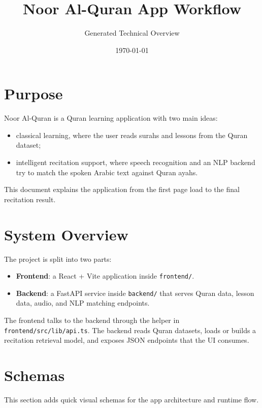 \documentclass[11pt,a4paper]{article}
\title{Noor Al-Quran App Workflow}\author{Generated Technical Overview}\date{\today}
\begin{document}
\maketitle

\section{Purpose}
Noor Al-Quran is a Quran learning application with two main ideas:
\begin{itemize}
  \item classical learning, where the user reads surahs and lessons from the Quran dataset;
  \item intelligent recitation support, where speech recognition and an NLP backend try to match the spoken Arabic text against Quran ayahs.
\end{itemize}

This document explains the application from the first page load to the final recitation result.

\section{System Overview}
The project is split into two parts:
\begin{itemize}
  \item \textbf{Frontend}: a React + Vite application inside \texttt{frontend/}.
  \item \textbf{Backend}: a FastAPI service inside \texttt{backend/} that serves Quran data, lesson data, audio, and NLP matching endpoints.
\end{itemize}

The frontend talks to the backend through the helper in \texttt{frontend/src/lib/api.ts}. The backend reads Quran datasets, loads or builds a recitation retrieval model, and exposes JSON endpoints that the UI consumes.

\section{Schemas}
This section adds quick visual schemas for the app architecture and runtime flow.
\end{document}
